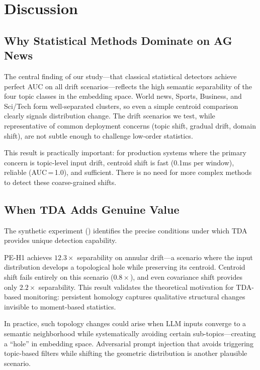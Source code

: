 \section{Discussion}
\label{sec:discussion}

\subsection{Why Statistical Methods Dominate on AG News}

The central finding of our study---that classical statistical detectors achieve perfect AUC on all \agnews drift scenarios---reflects the high semantic separability of the four topic classes in the \minilm embedding space. World news, Sports, Business, and Sci/Tech form well-separated clusters, so even a simple centroid comparison clearly signals distribution change. The drift scenarios we test, while representative of common deployment concerns (topic shift, gradual drift, domain shift), are not subtle enough to challenge low-order statistics.

This result is practically important: for production systems where the primary concern is topic-level input drift, centroid shift is fast (0.1ms per window), reliable (AUC\,=\,1.0), and sufficient. There is no need for more complex methods to detect these coarse-grained shifts.

\subsection{When TDA Adds Genuine Value}

The synthetic experiment () identifies the precise conditions under which TDA provides unique detection capability.

PE-H1 achieves $12.3\times$ separability on annular drift---a scenario where the input distribution develops a topological hole while preserving its centroid. Centroid shift fails entirely on this scenario ($0.8\times$), and even covariance shift provides only $2.2\times$ separability. This result validates the theoretical motivation for TDA-based monitoring: persistent homology captures qualitative structural changes invisible to moment-based statistics.

In practice, such topology changes could arise when LLM inputs converge to a semantic neighborhood while systematically avoiding certain sub-topics---creating a ``hole'' in embedding space. Adversarial prompt injection that avoids triggering topic-based filters while shifting the geometric distribution is another plausible scenario.

